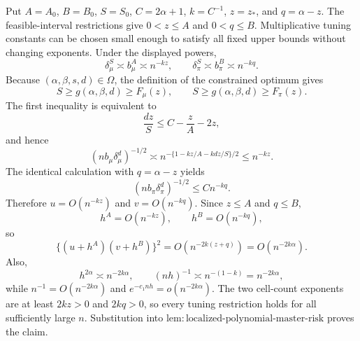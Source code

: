 Put \(A=A_0\), \(B=B_0\), \(S=S_0\), \(C=2\alpha+1\), \(k=C^{-1}\), \(z=z_*\), and \(q=\alpha-z\). The feasible-interval restrictions give \(0<z\le A\) and \(0<q\le B\). Multiplicative tuning constants can be chosen small enough to satisfy all fixed upper bounds without changing exponents. Under the displayed powers,
\[
\delta_\mu^S\asymp b_\mu^A\asymp n^{-kz},
\qquad
\delta_\pi^S\asymp b_\pi^B\asymp n^{-kq}.
\]
Because \((\alpha,\beta,s,d)\in\Omega\), the definition of the constrained optimum gives
\[
S\ge g(\alpha,\beta,d)\ge F_\mu(z),
\qquad
S\ge g(\alpha,\beta,d)\ge F_\pi(z).
\]
The first inequality is equivalent to
\[
\frac{dz}{S}
\le C-\frac zA-2z,
\]
and hence
\[
(nb_\mu\delta_\mu^d)^{-1/2}
\asymp
n^{-\{1-kz/A-kdz/S\}/2}
\le n^{-kz}.
\]
The identical calculation with \(q=\alpha-z\) yields
\[
(nb_\pi\delta_\pi^d)^{-1/2}
\le Cn^{-kq}.
\]
Therefore \(u=O(n^{-kz})\) and \(v=O(n^{-kq})\). Since \(z\le A\) and \(q\le B\),
\[
h^A=O(n^{-kz}),
\qquad
h^B=O(n^{-kq}),
\]
so
\[
\{(u+h^A)(v+h^B)\}^2
=O(n^{-2k(z+q)})
=O(n^{-2k\alpha}).
\]
Also,
\[
h^{2\alpha}\asymp n^{-2k\alpha},
\qquad
(nh)^{-1}\asymp n^{-(1-k)}=n^{-2k\alpha},
\]
while \(n^{-1}=O(n^{-2k\alpha})\) and \(e^{-c_1nh}=o(n^{-2k\alpha})\). The two cell-count exponents are at least \(2kz>0\) and \(2kq>0\), so every tuning restriction holds for all sufficiently large \(n\). Substitution into \(\mathrm{lem:localized\text{-}polynomial\text{-}master\text{-}risk}\) proves the claim.